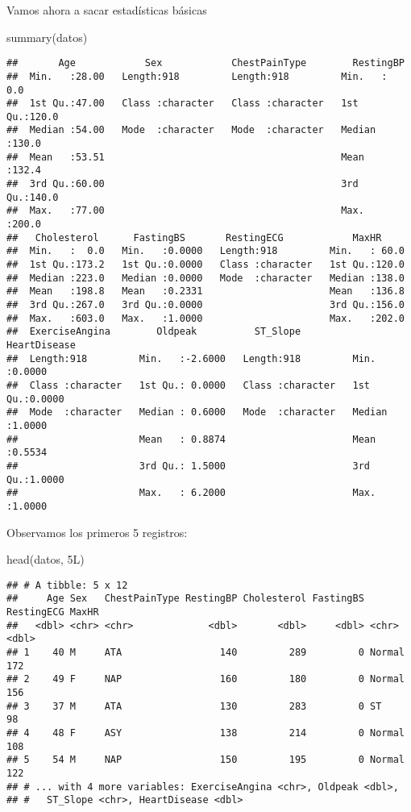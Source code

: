 \documentclass[
]{article}
\newenvironment{Shaded}{\begin{snugshade}}{\end{snugshade}}
\newcommand{\FunctionTok}[1]{\textcolor[rgb]{0.94,0.94,0.56}{#1}}
\newcommand{\NormalTok}[1]{\textcolor[rgb]{0.80,0.80,0.80}{#1}}
\begin{document}
Vamos ahora a sacar estadísticas básicas

\begin{Shaded}
\begin{Highlighting}[]
\FunctionTok{summary}\NormalTok{(datos)}
\end{Highlighting}
\end{Shaded}

\begin{verbatim}
##       Age            Sex            ChestPainType        RestingBP    
##  Min.   :28.00   Length:918         Length:918         Min.   :  0.0  
##  1st Qu.:47.00   Class :character   Class :character   1st Qu.:120.0  
##  Median :54.00   Mode  :character   Mode  :character   Median :130.0  
##  Mean   :53.51                                         Mean   :132.4  
##  3rd Qu.:60.00                                         3rd Qu.:140.0  
##  Max.   :77.00                                         Max.   :200.0  
##   Cholesterol      FastingBS       RestingECG            MaxHR      
##  Min.   :  0.0   Min.   :0.0000   Length:918         Min.   : 60.0  
##  1st Qu.:173.2   1st Qu.:0.0000   Class :character   1st Qu.:120.0  
##  Median :223.0   Median :0.0000   Mode  :character   Median :138.0  
##  Mean   :198.8   Mean   :0.2331                      Mean   :136.8  
##  3rd Qu.:267.0   3rd Qu.:0.0000                      3rd Qu.:156.0  
##  Max.   :603.0   Max.   :1.0000                      Max.   :202.0  
##  ExerciseAngina        Oldpeak          ST_Slope          HeartDisease   
##  Length:918         Min.   :-2.6000   Length:918         Min.   :0.0000  
##  Class :character   1st Qu.: 0.0000   Class :character   1st Qu.:0.0000  
##  Mode  :character   Median : 0.6000   Mode  :character   Median :1.0000  
##                     Mean   : 0.8874                      Mean   :0.5534  
##                     3rd Qu.: 1.5000                      3rd Qu.:1.0000  
##                     Max.   : 6.2000                      Max.   :1.0000
\end{verbatim}

Observamos los primeros 5 registros:

\begin{Shaded}
\begin{Highlighting}[]
\FunctionTok{head}\NormalTok{(datos, 5L)}
\end{Highlighting}
\end{Shaded}

\begin{verbatim}
## # A tibble: 5 x 12
##     Age Sex   ChestPainType RestingBP Cholesterol FastingBS RestingECG MaxHR
##   <dbl> <chr> <chr>             <dbl>       <dbl>     <dbl> <chr>      <dbl>
## 1    40 M     ATA                 140         289         0 Normal       172
## 2    49 F     NAP                 160         180         0 Normal       156
## 3    37 M     ATA                 130         283         0 ST            98
## 4    48 F     ASY                 138         214         0 Normal       108
## 5    54 M     NAP                 150         195         0 Normal       122
## # ... with 4 more variables: ExerciseAngina <chr>, Oldpeak <dbl>,
## #   ST_Slope <chr>, HeartDisease <dbl>
\end{verbatim}
\end{document}

